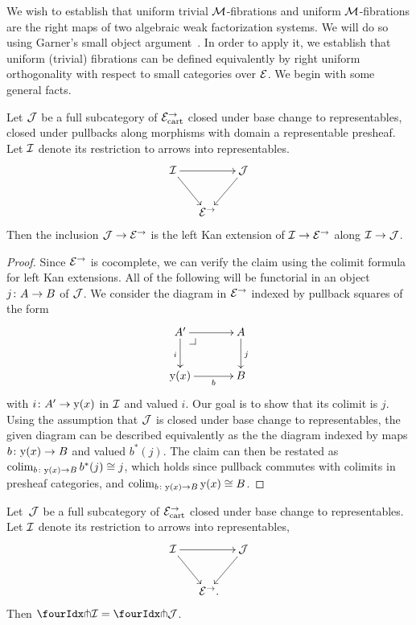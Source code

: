 \documentclass[reqno,10pt,a4paper,oneside,draft]{amsart}
\begin{document}
We wish to establish that uniform trivial $\cal{M}$-fibrations and uniform $\cal{M}$-fibrations are the right maps of two algebraic weak factorization systems.
We will do so using Garner's small object argument~\cite{garner:small-object-argument}.
In order to apply it, we establish that uniform (trivial) fibrations can be defined equivalently by right uniform orthogonality with respect to small categories over $\catE$.
We begin with some general facts.

\begin{lemma} \label{left-kan-extension-of-representables}
Let $\cal{J}$ be a full subcategory of $\catE_{\cart}^\to$ closed under base change to representables, \ie closed under pullbacks along morphisms with domain a representable presheaf.
Let $\cal{I}$ denote its restriction to arrows into representables.
\[
\xymatrix@C-1em{
  \cal{I}
  \ar[rr]
  \ar[dr]
&&
  \cal{J}
  \ar[dl]
\\&
  \catE^\to
}
\]
Then the inclusion $\cal{J} \to \catE^\to$ is the left Kan extension of $\cal{I} \to \catE^\to$ along $\cal{I} \to \cal{J}$.
\end{lemma}

\begin{proof}
Since $\catE^\to$ is cocomplete, we can verify the claim using the colimit formula for left Kan extensions.
All of the following will be functorial in an object $j \co A \to B$ of $\cal{J}$.
We consider the diagram in $\catE^\to$ indexed by pullback squares of the form
\[
\xymatrix@C=1.2cm{
  A'
  \ar[r]
  \ar[d]_{i}
  \pullback{dr}
&
  A
  \ar[d]^{j}
\\
  \yon(x)
  \ar[r]_-{b}
&
  B
}
\]
with $i \co A' \to \yon(x)$ in $\cal{I}$ and valued $i$.
Our goal is to show that its colimit is $j$.
Using the assumption that $\cal{J}$ is closed under base change to representables, the given diagram can be described equivalently as the the diagram indexed by maps $b \co \yon(x) \to B$ and valued $b^*(j)$.
The claim can then be restated as $\colim_{b \co \yon(x) \to B} b^*(j) \iso j$, which holds since pullback commutes with colimits in presheaf categories, and $\colim_{b \co \yon(x) \to B} \yon(x) \iso B$.
\end{proof}

\begin{proposition} \label{awfs-on-arrows-into-representables}
Let~$\cal{J}$ be a full subcategory of $\catE_{\cart}^\to$ closed under base change to representables.
Let $\cal{I}$ denote its restriction to arrows into representables,
\[
\xymatrix@C-1em{
  \cal{I}
  \ar[rr]
  \ar[dr]
&&
  \cal{J}
  \ar[dl]
\\&
  \catE^\to
\rlap{.}}
\]
Then $\liftr{\cal{I}} = \liftr{\cal{J}}$.
\end{proposition}
\end{document}
